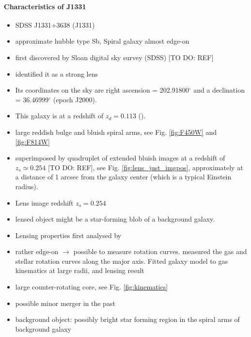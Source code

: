 \paragraph{Characteristics of J1331}
\begin{itemize}
\item SDSS J1331+3638 (J1331)
\item approximate hubble type Sb, Spiral galaxy almost edge-on
\item first discovered by Sloan digital sky survey (SDSS) [TO DO: REF]
\item \citet{SWELLSI} identified it as a strong lens
\item Its coordinates on the sky are right ascension = 202.91800$^\circ$ and a declination = 36.46999$^\circ$ (epoch J2000). 
\item This galaxy is at a redshift of $z_d = 0.113$ (\cite{SWELLSIII}).
\item large reddish bulge and bluish spiral arms, see Fig. \ref{fig:F450W} and \ref{fig:F814W}
\item superimposed by quadruplet of extended bluish images at a redshift of $z_s\simeq0.254$ [TO DO: REF], see Fig. \ref{fig:lens_just_imgpos}, approximately at a distance of 1 arcsec from the galaxy center (which is a typical Einstein radius).
\item Lens image redshift $z_s = 0.254$  \citep{SWELLSIII}
\item lensed object might be a star-forming blob of a background galaxy.
\item Lensing properties first analysed by \citet{SWELLSIII}
\item rather edge-on $\longrightarrow$ possible to measure rotation curves. \citet{SWELLSV} measured the gas and stellar rotation curves along the major axis. Fitted galaxy model to gas kinematics at large radii, and lensing result
\item large counter-rotating core, see Fig. \ref{fig:kinematics}
\item possible minor merger in the past
\item background object: possibly bright star forming region in the spiral arms of background galaxy 
\end{itemize}

